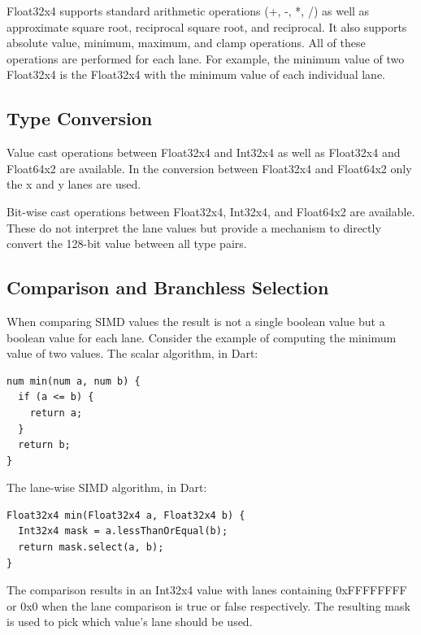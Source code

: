 \documentclass[preprint]{sigplanconf}
\begin{document}
Float32x4 supports standard arithmetic operations (+, -, *, /) as well as
approximate square root, reciprocal square root, and reciprocal. It also
supports absolute value, minimum, maximum, and clamp operations. All of these
operations are performed for each lane. For example, the minimum value of two
Float32x4 is the Float32x4 with the minimum value of each individual lane.

\subsection{Type Conversion}

Value cast operations between Float32x4 and Int32x4 as well as Float32x4 and
Float64x2 are available. In the conversion between Float32x4 and Float64x2 only
the x and y lanes are used.

Bit-wise cast operations between Float32x4, Int32x4, and Float64x2 are
available. These do not interpret the lane values but provide a mechanism to
directly convert the 128-bit value between all type pairs.

\subsection{Comparison and Branchless Selection}

When comparing SIMD values the result is not a single boolean value but a
boolean value for each lane. Consider the example of computing the minimum value
of two values. The scalar algorithm, in Dart:

\begin{small}
\begin{lstlisting}
num min(num a, num b) {
  if (a <= b) {
    return a;
  }
  return b;
}
\end{lstlisting}
\end{small}

The lane-wise SIMD algorithm, in Dart:

\begin{small}
\begin{lstlisting}
Float32x4 min(Float32x4 a, Float32x4 b) {
  Int32x4 mask = a.lessThanOrEqual(b);
  return mask.select(a, b);
}
\end{lstlisting}
\end{small}

The comparison results in an Int32x4 value with lanes containing 0xFFFFFFFF or
0x0 when the lane comparison is true or false respectively. The resulting mask
is used to pick which value's lane should be used.
\end{document}

